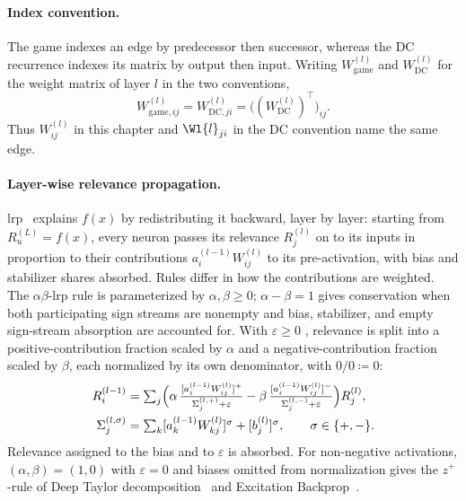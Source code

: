 \paragraph{Index convention.}
The game indexes an edge by predecessor then successor, whereas the DC recurrence indexes its matrix by output then input. Writing $W^{(l)}_{\mathrm{game}}$ and $W^{(l)}_{\mathrm{DC}}$ for the weight matrix of layer $l$ in the two conventions,
\[
 W^{(l)}_{\mathrm{game},ij}
 =W^{(l)}_{\mathrm{DC},ji}
 =\bigl((W^{(l)}_{\mathrm{DC}})^{\top}\bigr)_{ij}.
\]
Thus $W_{ij}^{(l)}$ in this chapter and $\Wl{l}_{ji}$ in the DC convention name the same edge.

\paragraph{Layer-wise relevance propagation.} \ac{lrp}~\parencite{Bach2015} explains $f(x)$ by redistributing it backward, layer by layer: starting
from $R^{(L)}_u = f(x)$, every neuron passes its relevance $R^{(l)}_j$ on to its inputs in
proportion to their contributions $a^{(l-1)}_i W^{(l)}_{ij}$ to its pre-activation, with bias and stabilizer shares absorbed.
Rules differ in how the contributions are weighted. The $\alpha\beta$-\ac{lrp} rule is parameterized by $\alpha,\beta\geq0$;
$\alpha-\beta=1$ gives conservation when both participating sign streams are nonempty and bias,
stabilizer, and empty sign-stream absorption are accounted for. With $\varepsilon\geq0$
,
relevance is split into a positive-contribution fraction scaled by $\alpha$ and a negative-contribution fraction scaled by
$\beta$, each normalized by its own denominator, with $0/0\coloneqq0$:
\begin{align}\label{ptnb:eq:lrp-ab}
    R^{(l-1)}_i &= \textstyle\sum_j \Bigl( \alpha\, \tfrac{[a^{(l-1)}_i
    W^{(l)}_{ij}]^+}{\Sigma^{(l,+)}_j + \varepsilon} - \beta\, \tfrac{[a^{(l-1)}_i
    W^{(l)}_{ij}]^-}{\Sigma^{(l,-)}_j + \varepsilon} \Bigr) R^{(l)}_j, \nonumber\\
    \Sigma^{(l,\sigma)}_j &= \textstyle\sum_k [a^{(l-1)}_k W^{(l)}_{kj}]^{\sigma} + [b^{(l)}_j]^{\sigma},\qquad \sigma\in\{+,-\}.
\end{align}
Relevance assigned to the bias and to $\varepsilon$ is absorbed. For non-negative activations,
$(\alpha,\beta)=(1,0)$ with $\varepsilon=0$ and biases omitted from normalization gives the
$z^+$-rule of Deep Taylor decomposition~\parencite{Montavon2017DeepTaylor} and
Excitation Backprop~\parencite{Zhang2018pointinggame}.

